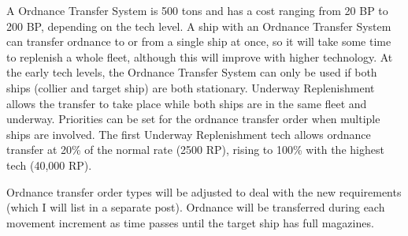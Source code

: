 \documentclass[../../Aurora C# unofficial manual.tex]{subfiles}
\begin{document}
	A Ordnance Transfer System is 500 tons and has a cost ranging from 20 BP to 200 BP, depending on the tech level. A ship with an Ordnance Transfer System can transfer ordnance to or from a single ship at once, so it will take some time to replenish a whole fleet, although this will improve with higher technology. At the early tech levels, the Ordnance Transfer System can only be used if both ships (collier and target ship) are both stationary. Underway Replenishment allows the transfer to take place while both ships are in the same fleet and underway. Priorities can be set for the ordnance transfer order when multiple ships are involved. The first Underway Replenishment tech allows ordnance transfer at 20\% of the normal rate (2500 RP), rising to 100\% with the highest tech (40,000 RP).
	
	Ordnance transfer order types will be adjusted to deal with the new requirements (which I will list in a separate post). Ordnance will be transferred during each movement increment as time passes until the target ship has full magazines.
\end{document}
